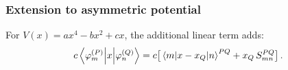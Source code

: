\subsubsection{Extension to asymmetric potential}

For $V(x) = ax^4 - bx^2 + cx$, the additional linear term adds:
\begin{equation}
  c\mel{\varphi_m^{(P)}}{x}{\varphi_n^{(Q)}} = c\bigl[\mel{m}{x-x_Q}{n}^{PQ} + x_Q\,S_{mn}^{PQ}\bigr]\,.
\end{equation}

